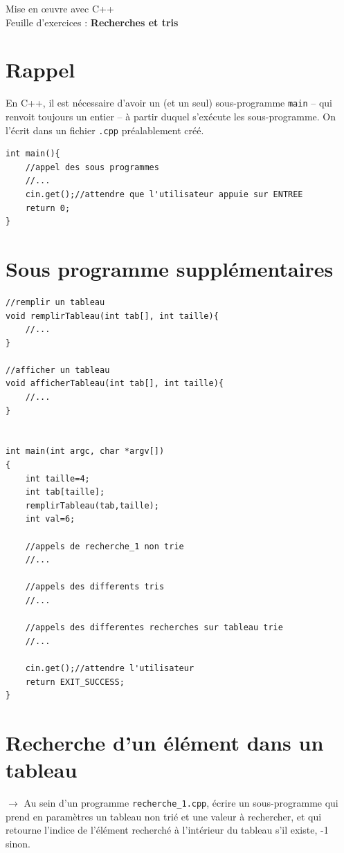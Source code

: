\documentclass[french]{article}
\begin{document}
	
	\begin{minipage}{\textwidth}
\begin{center}

{\Large Mise en œuvre avec C++ \\ Feuille d'exercices : \textbf{Recherches et tris}}
\end{center}
	\end{minipage}
	
\section*{Rappel}
En C++, il est nécessaire d'avoir un (et un seul) sous-programme \texttt{main} -- qui renvoit toujours un entier -- à partir duquel s'exécute les sous-programme. On l'écrit dans un fichier \texttt{.cpp} préalablement créé.
\begin{lstlisting}[caption={Exemple de main dans recherche1.cpp}]
int main(){
    //appel des sous programmes
    //...
    cin.get();//attendre que l'utilisateur appuie sur ENTREE
    return 0;
}    
\end{lstlisting}

\section*{Sous programme supplémentaires}
	\begin{lstlisting}[caption={Sous programmes supplémentaires}]
//remplir un tableau
void remplirTableau(int tab[], int taille){
    //...
}

//afficher un tableau
void afficherTableau(int tab[], int taille){
    //...
}


int main(int argc, char *argv[])
{
    int taille=4;
    int tab[taille];
    remplirTableau(tab,taille);
    int val=6;
    
    //appels de recherche_1 non trie 
    //...
    
    //appels des differents tris
    //...
    
    //appels des differentes recherches sur tableau trie
    //...
    
    cin.get();//attendre l'utilisateur
    return EXIT_SUCCESS;
}
\end{lstlisting}
\section{Recherche d'un élément dans un tableau}

	$\rightarrow$ Au sein d’un programme \texttt{recherche\_1.cpp}, écrire un sous-programme qui prend en paramètres un tableau non trié et une valeur à rechercher, et qui retourne l’indice de l’élément recherché à l’intérieur du tableau s’il existe, -1 sinon.
	
\end{document}
